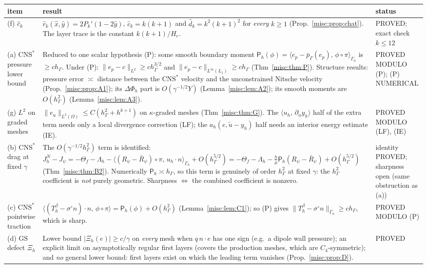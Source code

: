 \documentclass[11pt,reqno]{amsart}
\theoremstyle{plain}
\theoremstyle{definition}
\newcommand{\hG}{h_\Gamma}
\newcommand{\Gh}{\Gamma_h}
\newcommand{\dn}{\partial_n}
\newcommand{\ut}{\tilde u}
\newcommand{\pbG}{\bar p_{\Gamma}}
\newcommand{\ip}[2]{\langle #1,\, #2\rangle}
\newcommand{\norm}[1]{\lVert #1\rVert}
\newcommand{\GS}{\mathrm{GS}}
\newcommand{\CNS}{\mathrm{CNS}^\ast}
\newcommand{\Lay}{L_1}
\newcommand{\chat}{\hat c_k}
\newcommand{\Pm}{\mathsf P_h}     %
\newcommand{\Phih}{\Phi_h}        %
\begin{document}
\begin{center}\footnotesize
\begin{tabular}{>{\raggedright\arraybackslash}p{}>{\raggedright\arraybackslash}p{}>{\raggedright\arraybackslash}p{}}
\toprule
item & result & status\\
\midrule
(f) $\chat$ & $\hat r_k(\hat x,\hat y)=2P_k'(1-2\hat y)$, $\chat=k(k+1)$ and $\hat d_k=k^2(k+1)^2$ for \emph{every} $k\ge1$ (Prop.~\ref{misc:prop:chat}). The layer trace is the constant $k(k+1)/H_e$. & PROVED; exact check $k\le12$\\
(a) $\CNS$ pressure lower bound & Reduced to one scalar hypothesis (P): some smooth boundary moment $\Pm(\phi)=\ip{e_p-\pbG(e_p)}{\phi\circ\pi}_{\Gh}$ is $\ge c\hG$. Under (P): $\norm{e_p-c}_{L^2}\ge c\hG^{3/2}$ and $\norm{e_p-c}_{L^\infty(\Lay)}\ge c\hG$ (Thm~\ref{misc:thm:P}). Structure results: pressure error $\asymp$ distance between the $\CNS$ velocity and the unconstrained Nitsche velocity (Prop.~\ref{misc:prop:A1}); its $\Delta\Phih$ part is $O(\gamma^{-1/2}Y)$ (Lemma~\ref{misc:lem:A2}); its smooth moments are $O(\hG^2)$ (Lemma~\ref{misc:lem:A3}). & PROVED MODULO (P); (P) NUMERICAL\\
(g) $L^2$ on graded meshes & $\norm{e_u}_{L^2(\Omega)}\le C(\hG^2+h^{k+1})$ on $\kappa$-graded meshes (Thm~\ref{misc:thm:G}). The $\ip{u_h}{\dn y_h}$ half of the extra term needs only a local divergence correction (LF); the $a_h(e,\ut-y_h)$ half needs an interior energy estimate (IE). & PROVED MODULO (LF), (IE)\\
(b) $\CNS$ drag at fixed $\gamma$ & The $O(\gamma^{-1/2}\hG^2)$ term is identified: $J^N_h-J_\psi=-\Theta_f-\Lambda_h-\ip{(R_\psi-\bar R_\psi)\circ\pi}{u_h\cdot n}_{\Gh}+O(\hG^{5/2})=-\Theta_f-\Lambda_h-\frac h\mu\Pm(R_\psi-\bar R_\psi)+O(\hG^{5/2})$ (Thm~\ref{misc:thm:B2}). Numerically $\Pm\asymp\hG$, so this term is genuinely of order $\hG^2$ at fixed $\gamma$: the $\hG^2$ coefficient is \emph{not} purely geometric. Sharpness $\Leftrightarrow$ the combined coefficient is nonzero. & identity PROVED; sharpness open (same obstruction as (a))\\
(c) $\CNS$ pointwise traction & $\ip{(T^\beta_h-\sigma^\circ n)\cdot n}{\phi\circ\pi}=\Pm(\phi)+O(\hG^2)$ (Lemma~\ref{misc:lem:C1}); so (P) gives $\norm{T^\beta_h-\sigma^\circ n}_{\Gh}\ge c\hG$, which is sharp. & PROVED MODULO (P)\\
(d) $\GS$ defect $\Xi_h$ & Lower bound $|\Xi_h(e)|\ge c/\gamma$ on \emph{every} mesh when $q\,n\cdot e$ has one sign (e.g.\ a dipole wall pressure); an explicit limit on asymptotically regular first layers (covers the production meshes, which are $C_4$-symmetric); and \emph{no} general lower bound: first layers exist on which the leading term vanishes (Prop.~\ref{misc:prop:D}). & PROVED\\

\end{tabular}
\end{center}
\end{document}
